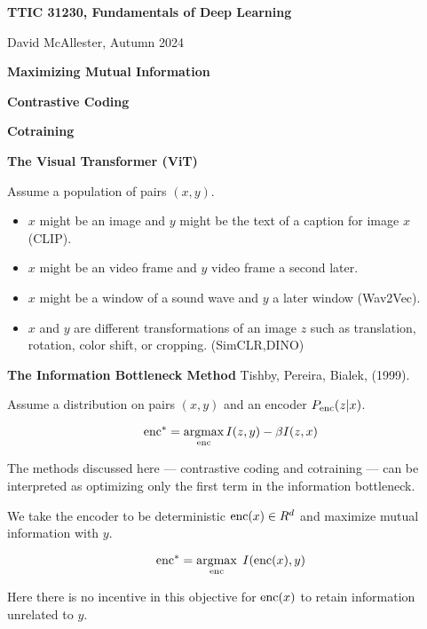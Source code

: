

\newcommand{\float}{\mathrm{Float}}



{\Huge
  \centerline{\bf TTIC 31230,  Fundamentals of Deep Learning}
  \vfill
  \centerline{David McAllester, Autumn   2024}
  \vfill
  \centerline{\bf Maximizing Mutual Information}
  \vfill
  \centerline{\bf Contrastive Coding}
  \vfill
  \centerline{\bf Cotraining}
  \vfill
  \centerline{\bf The Visual Transformer (ViT)}
  \vfill
  \vfill



Assume a population of pairs $(x,y)$.

 \vfill
\begin{itemize}
\item $x$ might be an image and $y$ might be the text of a caption for image $x$ (CLIP).

\vfill
\item $x$ might be an video frame and $y$ video frame a second later.

\vfill
\item $x$ might be a window of a sound wave and $y$ a later window (Wav2Vec).

\vfill
\item $x$ and $y$ are different transformations of an image $z$ such as translation, rotation, color shift, or cropping. (SimCLR,DINO)
\end{itemize}


{\bf The Information Bottleneck Method} Tishby, Pereira, Bialek, (1999).


\vfill
Assume a distribution on pairs $(x,y)$ and an encoder $P_{\mathrm{enc}}(z|x)$.

\vfill
$$\mathrm{enc}^* = \operatorname*{argmax}_{\mathrm{enc}} I(z,y) - \beta I(z,x)$$


The methods discussed here --- contrastive coding and cotraining --- can be interpreted as optimizing only the first term in the
information bottleneck.

\vfill
We take the encoder to be deterministic $\mathrm{enc}(x) \in R^d$ and maximize mutual information with $y$.

$$\mathrm{enc}^* = \operatorname*{argmax}_{\mathrm{enc}}\; I(\mathrm{enc}(x),y)$$

\vfill
Here there is no incentive in this objective for $\mathrm{enc}(x)$ to retain information unrelated to $y$.


}
